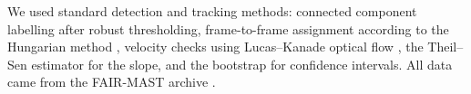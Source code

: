 We used standard detection and tracking methods: connected component labelling after robust thresholding, frame-to-frame assignment according to the Hungarian method \citep{kuhn1955hungarian}, velocity checks using Lucas--Kanade optical flow \citep{lucas1981iterative}, the Theil--Sen estimator \citep{sen1968estimates} for the slope, and the bootstrap \citep{efron1993bootstrap} for confidence intervals. All data came from the FAIR-MAST archive \citep{jackson2024fairmast}.
